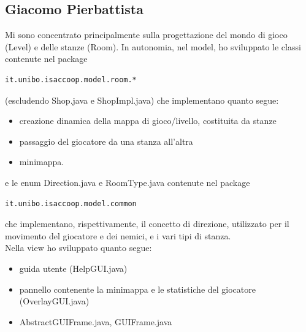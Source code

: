 \documentclass[a4paper,12pt]{report}
\begin{document}
\subsection*{Giacomo Pierbattista}
Mi sono concentrato principalmente sulla progettazione del mondo di gioco (Level) e delle stanze (Room).
In autonomia, nel model, ho sviluppato le classi contenute nel package 
\begin{verbatim}it.unibo.isaccoop.model.room.* \end{verbatim} (escludendo Shop.java e ShopImpl.java)
che implementano quanto segue:
\begin{itemize}
    \item creazione dinamica della mappa di gioco/livello, costituita da stanze
    \item passaggio del giocatore da una stanza all'altra
    \item minimappa.
\end{itemize}
e le enum Direction.java e RoomType.java contenute nel package
\begin{verbatim}it.unibo.isaccoop.model.common \end{verbatim}
che implementano, rispettivamente, il concetto di direzione, utilizzato per il movimento del giocatore e 
dei nemici, e i vari tipi di stanza.
\\Nella view ho sviluppato quanto segue:
\begin{itemize}
    \item guida utente (HelpGUI.java)
    \item pannello contenente la minimappa e le statistiche del giocatore (OverlayGUI.java)
    \item AbstractGUIFrame.java, GUIFrame.java
\end{itemize}
\end{document}
